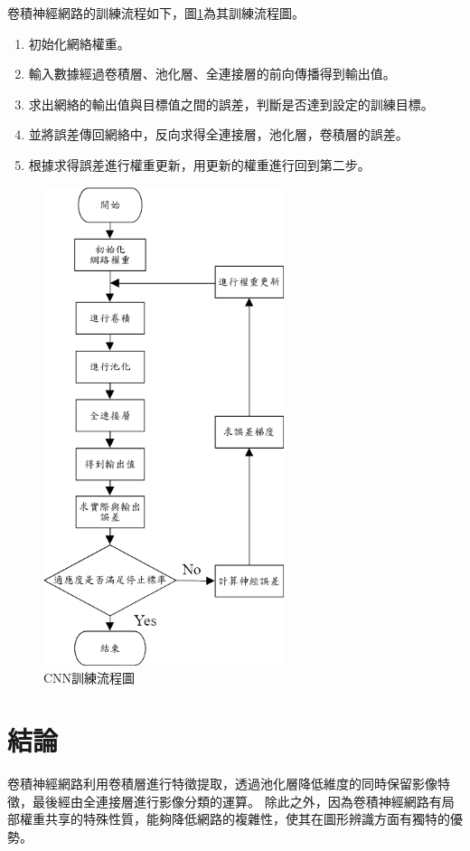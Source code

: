 卷積神經網路的訓練流程如下，圖\ref{fig:CNNTrainningFlowChart}為其訓練流程圖。

\begin{enumerate}
	\item
	      初始化網絡權重。
	\item
	      輸入數據經過卷積層、池化層、全連接層的前向傳播得到輸出值。
	\item
	      求出網絡的輸出值與目標值之間的誤差，判斷是否達到設定的訓練目標。
	\item
	      並將誤差傳回網絡中，反向求得全連接層，池化層，卷積層的誤差。
	\item
	      根據求得誤差進行權重更新，用更新的權重進行回到第二步。
\end{enumerate}
\begin{figure}[H]
	\centerline{\includegraphics[height=14cm]{./pic/iigz3LNt.png}}
	\caption{CNN訓練流程圖}
	\label{fig:CNNTrainningFlowChart}
\end{figure}

\section{結論}
卷積神經網路利用卷積層進行特徵提取，透過池化層降低維度的同時保留影像特徵，最後經由全連接層進行影像分類的運算。
除此之外，因為卷積神經網路有局部權重共享的特殊性質，能夠降低網路的複雜性，使其在圖形辨識方面有獨特的優勢。

